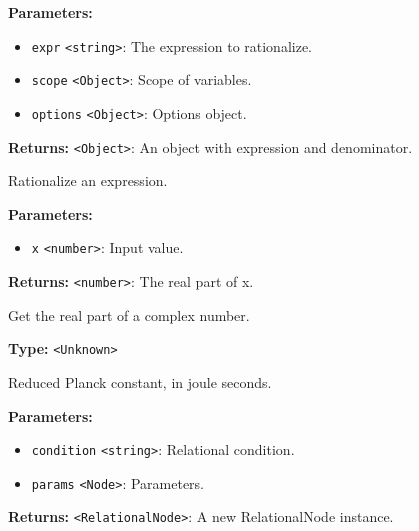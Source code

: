 \documentclass[12pt,a4paper]{article}
\begin{document}
\noindent \textbf{Parameters:}
\begin{itemize}
  \item \texttt{expr} \texttt{<string>}: The expression to rationalize.
  \item \texttt{scope} \texttt{<Object>}: Scope of variables.
  \item \texttt{options} \texttt{<Object>}: Options object.
\end{itemize}

\noindent \textbf{Returns:} \texttt{<Object>}: An object with expression and denominator.

\noindent Rationalize an expression.

\vspace{5mm}
\noindent {}


\noindent \textbf{Parameters:}
\begin{itemize}
  \item \texttt{x} \texttt{<number>}: Input value.
\end{itemize}

\noindent \textbf{Returns:} \texttt{<number>}: The real part of x.

\noindent Get the real part of a complex number.

\vspace{5mm}
\noindent {}\vspace{4mm}


\noindent \textbf{Type:} \texttt{<Unknown>}

\noindent Reduced Planck constant, in joule seconds.

\vspace{5mm}
\noindent {}


\noindent \textbf{Parameters:}
\begin{itemize}
  \item \texttt{condition} \texttt{<string>}: Relational condition.
  \item \texttt{params} \texttt{<Node>}: Parameters.
\end{itemize}

\noindent \textbf{Returns:} \texttt{<RelationalNode>}: A new RelationalNode instance.
\end{document}
